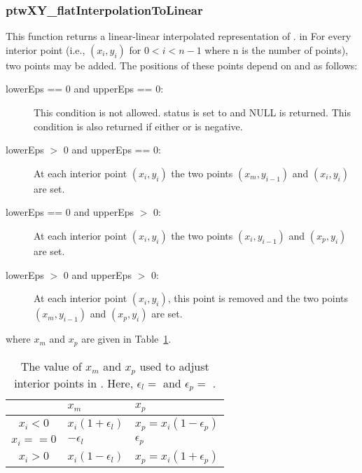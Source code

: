 \subsubsection{ptwXY\_flatInterpolationToLinear}
This function returns a linear-linear interpolated representation of .
     in \noindent
For every interior point (i.e., $(x_i,y_i)$ for $0 < i < n - 1$ where n is the number of points), two points may be added.
The positions of these points depend on  and  as follows:
\begin{description}
    \item[lowerEps ==  0 and upperEps ==  0:] This condition is not allowed. status is set to  and NULL is returned.
        This condition is also returned if either  or  is negative.
    \item[lowerEps $>$ 0 and upperEps ==  0:] At each interior point $(x_i,y_i)$ the two points $(x_m,y_{i-1})$ and $(x_i,y_i)$ are set.
    \item[lowerEps ==  0 and upperEps $>$ 0:] At each interior point $(x_i,y_i)$ the two points $(x_i,y_{i-1})$ and $(x_p,y_i)$ are set.
    \item[lowerEps $>$ 0 and upperEps $>$ 0:] At each interior point $(x_i,y_i)$, this point is removed and the two 
        points $(x_m,y_{i-1})$ and $(x_p,y_i)$ are set.
\end{description}
where $x_m$ and $x_p$ are given in Table~\ref{flatInterpolationToLinear}.
\begin{table}
\begin{center}
\begin{tabular}{|c|l|l|}  \hline
                & $x_m$                    & $x_p$                          \\ \hline \hline
    $x_i <  0$  & $x_i ( 1 + \epsilon_l )$ & $x_p = x_i ( 1 - \epsilon_p )$ \\ \hline
    $x_i == 0$  & $ -\epsilon_l $          & $ \epsilon_p $                 \\ \hline
    $x_i >  0$  & $x_i ( 1 - \epsilon_l )$ & $x_p = x_i ( 1 + \epsilon_p )$ \\ \hline
\end{tabular}
\end{center}
\caption{The value of $x_m$ and $x_p$ used to adjust interior points in . 
    Here, $ \epsilon_l = $  and $ \epsilon_p = $ . \label{flatInterpolationToLinear}}
\end{table}

